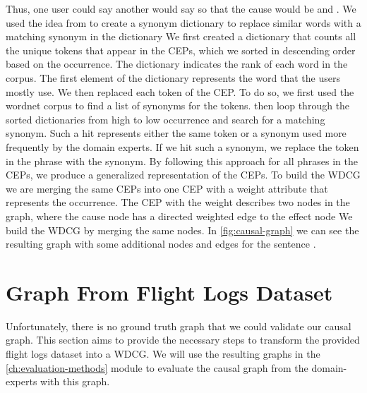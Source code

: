 Thus, one user could say  another would say  so that the cause would be  and .
We used the idea from \cite{Hassanzadeh19} to create a synonym dictionary to replace similar words with a matching synonym in the dictionary
We first created a dictionary that counts all the unique tokens that appear in the \ac{CEP}s, which we sorted in descending order based on the occurrence.
The dictionary indicates the rank of each word in the corpus.
The first element of the dictionary represents the word that the users mostly use.
We then replaced each token of the \ac{CEP}.
To do so, we first used the wordnet corpus to find a list of synonyms for the tokens.
then loop through the sorted dictionaries from high to low occurrence and search for a matching synonym.
Such a hit represents either the same token or a synonym used more frequently by the domain experts.
If we hit such a synonym, we replace the token in the phrase with the synonym.
By following this approach for all phrases in the \ac{CEP}s, we produce a generalized representation of the \ac{CEP}s.
To build the \ac{WDCG} we are merging the same \ac{CEP}s into one \ac{CEP} with a weight attribute that represents the occurrence.
The \ac{CEP} with the weight describes two nodes in the graph, where the cause node has a directed weighted edge to the effect node
We build the \ac{WDCG} by merging the same nodes.
In \autoref{fig:causal-graph} we can see the resulting graph with some additional nodes and edges for the sentence .


\section{Graph From Flight Logs Dataset}\label{sec:graph-from-flight-logs-dataset}
Unfortunately, there is no ground truth graph that we could validate our causal graph.
This section aims to provide the necessary steps to transform the provided flight logs dataset into a \ac{WDCG}.
We will use the resulting graphs in the \autoref{ch:evaluation-methods} module to evaluate the causal graph from the domain-experts with this graph.

